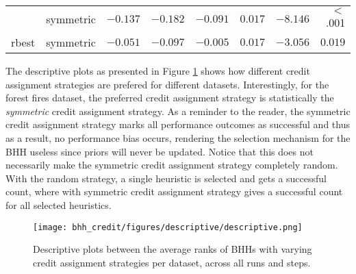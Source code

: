 \begin{table}[htbp]
{\begin{tabular}{lrrrrrrr}
			$ $                  & symmetric            & $-0.137$             & $-0.182$                                        & $-0.091$             & $0.017$              & $-8.146$             & $<$ .001    \\
			rbest                & symmetric            & $-0.051$             & $-0.097$                                        & $-0.005$             & $0.017$              & $-3.056$             & $0.019$     \\
			\bottomrule
		\end{tabular}
	}
\end{table}

The descriptive plots as presented in Figure \ref{fig:results:credit:descriptive:descriptive} shows how different credit assignment strategies are prefered for different datasets. Interestingly, for the forest fires dataset, the preferred credit assignment strategy is statistically the \textit{symmetric} credit assignment strategy. As a reminder to the reader, the symmetric credit assignment strategy marks all performance outcomes as successful and thus as a result, no performance bias occurs, rendering the selection mechanism for the \Ac{BHH} useless since priors will never be updated. Notice that this does not necessarily make the symmetric credit assignment strategy completely random. With the random strategy, a single heuristic is selected and gets a successful count, where with symmetric credit assignment strategy gives a successful count for all selected heuristics.

\begin{figure}[htbp]
	\centering
	\texttt{[image: bhh\_credit/figures/descriptive/descriptive.png]}
	\caption{Descriptive plots between the average ranks of \Acsp{BHH} with varying credit assignment strategies per dataset, across all runs and steps.}
	\label{fig:results:credit:descriptive:descriptive}
\end{figure}

